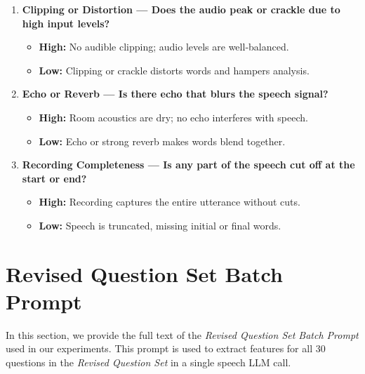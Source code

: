 \documentclass{report}
\begin{document}
\begin{enumerate}
  \item \textbf{Clipping or Distortion — Does the audio peak or crackle due to high input levels?}
  \begin{itemize}
    \item \textbf{High:} No audible clipping; audio levels are well‑balanced.
    \item \textbf{Low:} Clipping or crackle distorts words and hampers analysis.
  \end{itemize}

  \item \textbf{Echo or Reverb — Is there echo that blurs the speech signal?}
  \begin{itemize}
    \item \textbf{High:} Room acoustics are dry; no echo interferes with speech.
    \item \textbf{Low:} Echo or strong reverb makes words blend together.
  \end{itemize}

  \item \textbf{Recording Completeness — Is any part of the speech cut off at the start or end?}
  \begin{itemize}
    \item \textbf{High:} Recording captures the entire utterance without cuts.
    \item \textbf{Low:} Speech is truncated, missing initial or final words.
  \end{itemize}
\end{enumerate}

\section{Revised Question Set Batch Prompt}
\label{app_sec:revised_question_set_batch}
In this section, we provide the full text of the \emph{Revised Question Set Batch Prompt} used in our experiments. This prompt is used to extract features for all 30 questions in the \emph{Revised Question Set} in a single speech LLM call.
\end{document}
